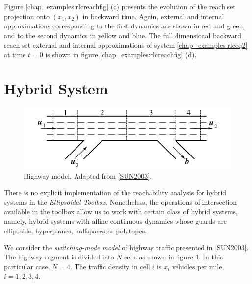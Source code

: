 \documentclass[letterpaper,10pt,english]{sphinxmanual}
\begin{document}
\hyperref[chap_examples:rlcreachfig]{Figure  \ref*{chap_examples:rlcreachfig}} (c) presents the evolution of the reach set projection onto
$(x_1, x_2)$ in backward time. Again, external and internal
approximations corresponding to the first dynamics are shown in red and
green, and to the second dynamics in yellow and blue. The full
dimensional backward reach set external and internal approximations of
system \eqref{chap_examples-rlceq2} at time $t=0$ is shown in \hyperref[chap_examples:rlcreachfig]{figure  \ref*{chap_examples:rlcreachfig}} (d).


\section{Hybrid System}
\label{chap_examples:hybrid-system}\begin{figure}[htbp]
\centering
\capstart

\includegraphics[width=0.300\linewidth]{chapter06_section04_hw.png}
\caption{Highway model. Adapted from {\hyperref[chap_examples:sun2003]{{[}SUN2003{]}}}.}\label{chap_examples:hwfig}\end{figure}

There is no explicit implementation of the reachability analysis for
hybrid systems in the \emph{Ellipsoidal Toolbox}. Nonetheless, the operations
of intersection available in the toolbox allow us to work with certain
class of hybrid systems, namely, hybrid systems with affine continuous
dynamics whose guards are ellipsoids, hyperplanes, halfspaces or
polytopes.

We consider the \emph{switching-mode model} of highway traffic presented in
{\hyperref[chap_examples:sun2003]{{[}SUN2003{]}}}. The highway segment is divided into $N$
cells as shown in \hyperref[chap_examples:hwfig]{figure  \ref*{chap_examples:hwfig}}. In this particular case, $N=4$.
The traffic density in cell $i$ is $x_i$ vehicles per mile,
$i=1,2,3,4$.
\end{document}
